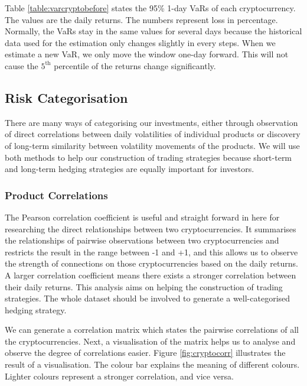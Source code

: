 \documentclass[11pt]{article} %
\theoremstyle{plain}
\theoremstyle{definition}
\begin{document}
Table \ref{table:varcryptobefore} states the 95\% 1-day VaRs of each cryptocurrency. The values are the daily returns. The numbers represent loss in percentage. Normally, the VaRs stay in the same values for several days because the historical data used for the estimation only changes slightly in every steps. When we estimate a new VaR, we only move the window one-day forward. This will not cause the $5^{\mathrm{th}}$ percentile of the returns change significantly.

\subsection{Risk Categorisation}

There are many ways of categorising our investments, either through observation of direct correlations between daily volatilities of individual products or discovery of long-term similarity between volatility movements of the products. We will use both methods to help our construction of trading strategies because short-term and long-term hedging strategies are equally important for investors.

\subsubsection{Product Correlations}

The Pearson correlation coefficient is useful and straight forward in here for researching the direct relationships between two cryptocurrencies. It summarises the relationships of pairwise observations between two cryptocurrencies and restricts the result in the range between -1 and +1, and this allows us to observe the strength of connections on those cryptocurrencies based on the daily returns. A larger correlation coefficient means there exists a stronger correlation between their daily returns. This analysis aims on helping the construction of trading strategies. The whole dataset should be involved to generate a well-categorised hedging strategy.

We can generate a correlation matrix which states the pairwise correlations of all the cryptocurrencies. Next, a visualisation of the matrix helps us to analyse and observe the degree of correlations easier. Figure \ref{fig:cryptocorr} illustrates the result of a visualisation. The colour bar explains the meaning of different colours. Lighter colours represent a stronger correlation, and vice versa.
\end{document}
